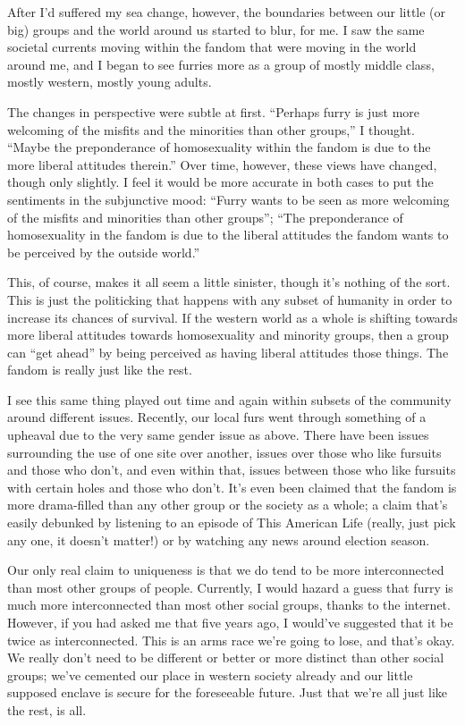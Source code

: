 After I'd suffered my sea change, however, the boundaries between our little (or big) groups and the world around us started to blur, for me. I saw the same societal currents moving within the fandom that were moving in the world around me, and I began to see furries more as a group of mostly middle class, mostly western, mostly young adults.

The changes in perspective were subtle at first. ``Perhaps furry is just more welcoming of the misfits and the minorities than other groups,'' I thought. ``Maybe the preponderance of homosexuality within the fandom is due to the more liberal attitudes therein.'' Over time, however, these views have changed, though only slightly. I feel it would be more accurate in both cases to put the sentiments in the subjunctive mood: ``Furry wants to be seen as more welcoming of the misfits and minorities than other groups''; ``The preponderance of homosexuality in the fandom is due to the liberal attitudes the fandom wants to be perceived by the outside world.''

This, of course, makes it all seem a little sinister, though it's nothing of the sort. This is just the politicking that happens with any subset of humanity in order to increase its chances of survival. If the western world as a whole is shifting towards more liberal attitudes towards homosexuality and minority groups, then a group can ``get ahead'' by being perceived as having liberal attitudes those things. The fandom is really just like the rest.

I see this same thing played out time and again within subsets of the community around different issues. Recently, our local furs went through something of a upheaval due to the very same gender issue as above. There have been issues surrounding the use of one site over another, issues over those who like fursuits and those who don't, and even within that, issues between those who like fursuits with certain holes and those who don't. It's even been claimed that the fandom is more drama-filled than any other group or the society as a whole; a claim that's easily debunked by listening to an episode of This American Life (really, just pick any one, it doesn't matter!) or by watching any news around election season.

Our only real claim to uniqueness is that we do tend to be more interconnected than most other groups of people. Currently, I would hazard a guess that furry is much more interconnected than most other social groups, thanks to the internet. However, if you had asked me that five years ago, I would've suggested that it be twice as interconnected. This is an arms race we're going to lose, and that's okay. We really don't need to be different or better or more distinct than other social groups; we've cemented our place in western society already and our little supposed enclave is secure for the foreseeable future. Just that we're all just like the rest, is all.
